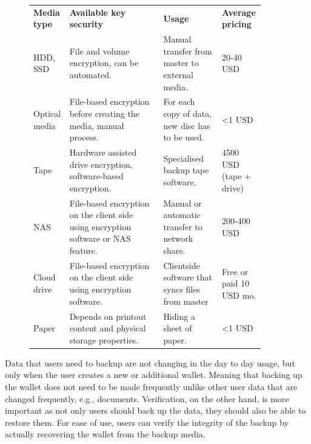 \documentclass[
  printed, %
  table,   %
  nolof,     %
  nolot,     %
           oneside, color
]{fithesis3}
\begin{document}
\begin{figure}[H]
\centering
\begin{tabular}{p{0.1\linewidth}p{0.4\linewidth}p{0.25\linewidth}p{0.15\linewidth}}
\textbf{Media type} & \textbf{Available key security}                                    & \textbf{Usage}                                   & \textbf{Average pricing}      \\
HDD, SSD            & File and volume encryption, can be automated.                       & Manual transfer from master to external media.    & 20-40 USD                              \\
Optical media       & File-based encryption before creating the media, manual process.            & For each copy of data, new disc has to be used.   & \textless{}1 USD                       \\
Tape                & Hardware assisted drive encryption, software-based encryption.       & Specialised backup tape software.                & 4500 USD (tape + drive) \\
NAS                 & File-based encryption on the client side using encryption software or NAS feature. & Manual or automatic transfer to network share.    & 200-400 USD                            \\
Cloud drive       & File-based encryption on the client side using encryption software. & Clientside software that syncs files from master & Free or paid 10 USD mo.                      \\
Paper               & Depends on printout content and physical storage properties.        & Hiding a sheet of paper.                          & \textless{}1 USD                       \\

\end{tabular}


\label{table:secure-storage}
\end{figure}

Data that users need to backup are not changing in the day to day usage, but only when the user creates a new or additional wallet. Meaning that backing up the wallet does not need to be made frequently unlike other user data that are changed frequently, e.g., documents. Verification, on the other hand, is more important as not only users should back up the data, they should also be able to restore them. For ease of use, users can verify the integrity of the backup by actually recovering the wallet from the backup media.
\end{document}
